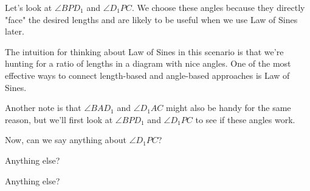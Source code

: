 

Let's look at $\angle BPD_1$ and $\angle D_1PC$. We choose these angles because they directly "face" the desired lengths and are likely to be useful when we use Law of Sines later.

The intuition for thinking about Law of Sines in this scenario is that we're hunting for a ratio of lengths in a diagram with nice angles. One of the most effective ways to connect length-based and angle-based approaches is Law of Sines.



Another note is that $\angle BAD_1$ and $\angle D_1AC$ might also be handy for the same reason, but we'll first look at $\angle BPD_1$ and $\angle D_1PC$ to see if these angles work.

Now, can we say anything about $\angle D_1PC$?




Anything else?



Anything else?




